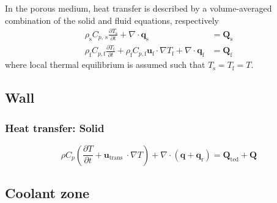 In the porous medium, heat transfer is described by a volume-averaged combination of the solid and fluid equations, respectively \cite{comsol_heat_2020}
\begin{align}
    \rho_{\mathrm{s}} C_{p, \mathrm{~s}} \frac{\partial T_{\mathrm{s}}}{\partial t}+\nabla \cdot \mathbf{q}_{\mathrm{s}} &= \mathbf{Q}_{\mathrm{s}} \\
    \rho_{\mathrm{f}} C_{p, \mathrm{f}} \frac{\partial T_{\mathrm{f}}}{\partial t}+\rho_{\mathrm{f}} C_{p, \mathrm{f}} \mathbf{u}_{\mathrm{f}} \cdot \nabla T_{\mathrm{f}}+\nabla \cdot \mathbf{q}_{\mathrm{f}} &= \mathbf{Q}_{\mathrm{f}}
\end{align}
where local thermal equilibrium is assumed such that $T_{\mathrm{s}} = T_{\mathrm{f}} = T$.

\subsection{Wall}

\subsubsection{Heat transfer: Solid}
\cite{comsol_heat_2020}
\begin{equation}
    \rho C_{p}\left(\frac{\partial T}{\partial t}+\mathbf{u}_{\text {trans }} \cdot \nabla T\right)+\nabla \cdot\left(\mathbf{q}+\mathbf{q}_{\mathrm{r}}\right)= \mathbf{Q}_{\mathrm{ted}}+ \mathbf{Q}
\end{equation}

\subsection{Coolant zone}

